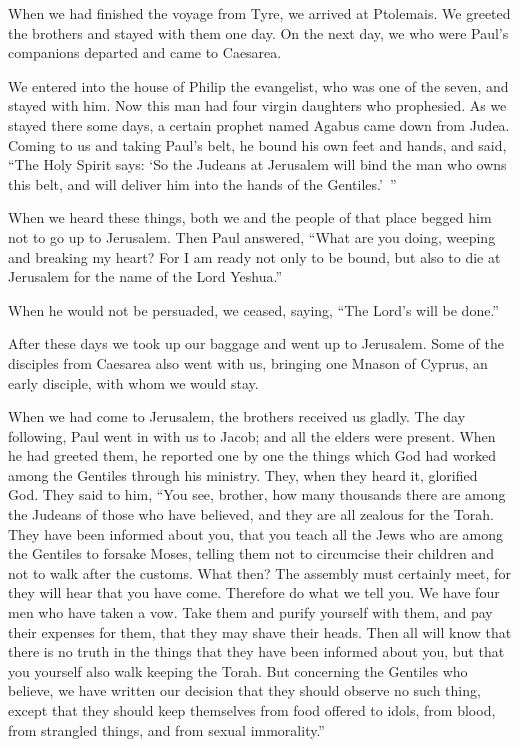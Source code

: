 \myverse{}When we had finished the voyage from Tyre, we arrived at Ptolemais.
We greeted the brothers and stayed with them one day.
\myverse{}On the next day, we who were Paul’s companions departed and came to Caesarea.

We entered into the house of Philip the evangelist, who was one of the seven, and stayed
with him.
\myverse{}Now this man had four virgin daughters who prophesied.
\myverse{}As we stayed there some days, a certain prophet named Agabus came down from
Judea.
\myverse{}Coming to us and taking Paul’s belt, he bound his own feet and hands, and
said, “The Holy Spirit says: ‘So the Judeans at Jerusalem will bind the man who owns this belt, and will
deliver him into the hands of the Gentiles.’ ”

\myverse{}When we heard these things, both we and the people of that place
begged him not to go up to Jerusalem.
\myverse{}Then Paul answered, “What are you doing, weeping and breaking my heart? For
I am ready not only to be bound, but also to die at Jerusalem for the name of the Lord Yeshua.”

\myverse{}When he would not be persuaded, we ceased, saying, “The Lord’s
will be done.”

\myverse{}After these days we took up our baggage and went up to Jerusalem.
\myverse{}Some of the disciples from Caesarea also went with us, bringing one Mnason
of Cyprus, an early disciple, with whom we would stay.

\myverse{}When we had come to Jerusalem, the brothers received us gladly.
\myverse{}The day following, Paul went in with us to Jacob; and all the elders were
present.
\myverse{}When he had greeted them, he reported one by one the things which God had
worked among the Gentiles through his ministry.
\myverse{}They, when they heard it, glorified God. They said to him, “You see, brother,
how many thousands there are among the Judeans of those who have believed, and they are all zealous for the Torah.
\myverse{}They have been informed about you, that you teach all the Jews who are among
the Gentiles to forsake Moses, telling them not to circumcise their children and not to walk after the
customs.
\myverse{}What then? The assembly must certainly meet, for they will hear that you
have come.
\myverse{}Therefore do what we tell you. We have four men who have taken a vow.
\myverse{}Take them and purify yourself with them, and pay their expenses for them,
that they may shave their heads. Then all will know that there is no truth in the things that they have
been informed about you, but that you yourself also walk keeping the Torah.
\myverse{}But concerning the Gentiles who believe, we have written our decision that
they should observe no such thing, except that they should keep themselves from food offered to idols,
from blood, from strangled things, and from sexual immorality.”

